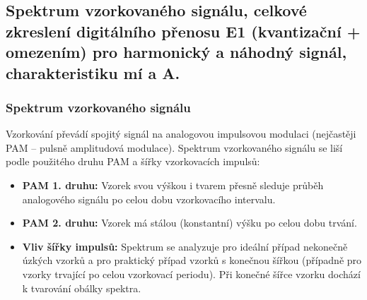 \subsection{Spektrum vzorkovaného signálu, celkové zkreslení  digitálního přenosu E1 (kvantizační + omezením) pro harmonický a náhodný signál, charakteristiku mí a A.}
    \subsubsection{Spektrum vzorkovaného signálu}
        Vzorkování převádí spojitý signál na analogovou impulsovou modulaci (nejčastěji PAM -- pulsně amplitudová modulace). Spektrum vzorkovaného signálu se liší podle použitého druhu PAM a šířky vzorkovacích impulsů:
        
        \begin{itemize}
            \item \textbf{PAM 1. druhu:} Vzorek svou výškou i tvarem přesně sleduje průběh analogového signálu po celou dobu vzorkovacího intervalu.
            \item \textbf{PAM 2. druhu:} Vzorek má stálou (konstantní) výšku po celou dobu trvání.
            \item \textbf{Vliv šířky impulsů:} Spektrum se analyzuje pro ideální případ nekonečně úzkých vzorků a pro praktický případ vzorků s konečnou šířkou (případně pro vzorky trvající po celou vzorkovací periodu). Při konečné šířce vzorku dochází k tvarování obálky spektra.
        \end{itemize}
